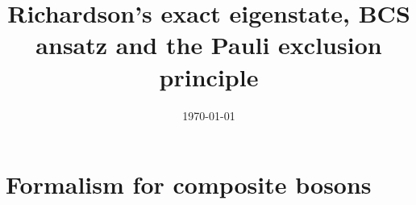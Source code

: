 \documentclass[aps,prb,preprint,groupedaddress,amsmath]{revtex4-1}
\begin{document}

\title{Richardson's exact eigenstate, BCS ansatz and the Pauli exclusion principle}


\author{}
\affiliation{}


\date{\today}

\begin{abstract}
\end{abstract}

\pacs{}

\maketitle

\section{Formalism for composite bosons\label{sec:formalism}}
\end{document}
